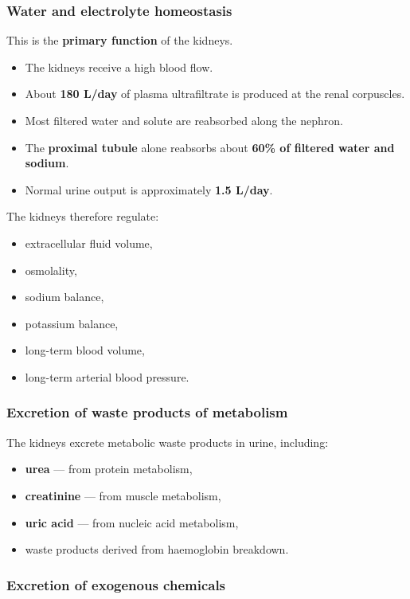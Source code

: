 \documentclass[11pt,a4paper]{article}
\begin{document}
\subsubsection{Water and electrolyte homeostasis}

This is the \textbf{primary function} of the kidneys.
\begin{itemize}
    \item The kidneys receive a high blood flow.
    \item About \textbf{180 L/day} of plasma ultrafiltrate is produced at the renal corpuscles.
    \item Most filtered water and solute are reabsorbed along the nephron.
    \item The \textbf{proximal tubule} alone reabsorbs about \textbf{60\% of filtered water and sodium}.
    \item Normal urine output is approximately \textbf{1.5 L/day}.
\end{itemize}

The kidneys therefore regulate:
\begin{itemize}
    \item extracellular fluid volume,
    \item osmolality,
    \item sodium balance,
    \item potassium balance,
    \item long-term blood volume,
    \item long-term arterial blood pressure.
\end{itemize}

\subsubsection{Excretion of waste products of metabolism}

The kidneys excrete metabolic waste products in urine, including:
\begin{itemize}
    \item \textbf{urea} --- from protein metabolism,
    \item \textbf{creatinine} --- from muscle metabolism,
    \item \textbf{uric acid} --- from nucleic acid metabolism,
    \item waste products derived from haemoglobin breakdown.
\end{itemize}

\subsubsection{Excretion of exogenous chemicals}
\end{document}
